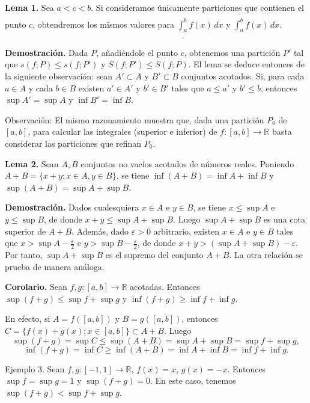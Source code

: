 \documentclass[12pt,oneside]{book}
\begin{document}
\textbf{Lema 1.} Sea \(a < c < b\). Si consideramos únicamente particiones que contienen el punto \(c\), obtendremos los mismos valores para \(\underline{\int_a^b} f(x) \, dx\) y \(\overline{\int_a^b} f(x) \, dx\).

\textbf{Demostración.} Dada \(P\), añadiéndole el punto \(c\), obtenemos una partición \(P'\) tal que \(s(f; P) \leq s(f; P')\) y \(S(f; P') \leq S(f; P)\). El lema se deduce entonces de la siguiente observación: sean \(A' \subset A\) y \(B' \subset B\) conjuntos acotados. Si, para cada \(a \in A\) y cada \(b \in B\) existen \(a' \in A'\) y \(b' \in B'\) tales que \(a \leq a'\) y \(b' \leq b\), entonces \(\sup A' = \sup A\) y \(\inf B' = \inf B\).

Observación: El mismo razonamiento muestra que, dada una partición \(P_0\) de \([a, b]\), para calcular las integrales (superior e inferior) de \(f: [a, b] \to \mathbb{R}\) basta considerar las particiones que refinan \(P_0\).

\textbf{Lema 2.} Sean \(A, B\) conjuntos no vacíos acotados de números reales. Poniendo \(A + B = \{x + y; x \in A, y \in B\}\), se tiene \(\inf(A + B) = \inf A + \inf B\) y \(\sup(A + B) = \sup A + \sup B\).

\textbf{Demostración.} Dados cualesquiera \(x \in A\) e \(y \in B\), se tiene \(x \leq \sup A\) e \(y \leq \sup B\), de donde \(x + y \leq \sup A + \sup B\). Luego \(\sup A + \sup B\) es una cota superior de \(A + B\). Además, dado \(\varepsilon > 0\) arbitrario, existen \(x \in A\) e \(y \in B\) tales que \(x > \sup A - \frac{\varepsilon}{2}\) e \(y > \sup B - \frac{\varepsilon}{2}\), de donde \(x + y > (\sup A + \sup B) - \varepsilon\). Por tanto, \(\sup A + \sup B\) es el supremo del conjunto \(A + B\). La otra relación se prueba de manera análoga.

\textbf{Corolario.} Sean \(f, g: [a, b] \to \mathbb{R}\) acotadas. Entonces \(\sup(f+g) \leq \sup f + \sup g\) y \(\inf(f+g) \geq \inf f + \inf g\).

En efecto, si \(A = f([a, b])\) y \(B = g([a, b])\), entonces \(C = \{f(x) + g(x); x \in [a, b]\} \subset A + B\). Luego
\[\sup(f+g) = \sup C \leq \sup(A + B) = \sup A + \sup B = \sup f + \sup g,\]
\[\inf(f+g) = \inf C \geq \inf(A + B) = \inf A + \inf B = \inf f + \inf g.\]

Ejemplo 3. Sean \(f, g: [-1, 1] \to \mathbb{R}\), \(f(x) = x\), \(g(x) = -x\). Entonces \(\sup f = \sup g = 1\) y \(\sup(f+g) = 0\). En este caso, tenemos \(\sup(f+g) < \sup f + \sup g\).
\end{document}
